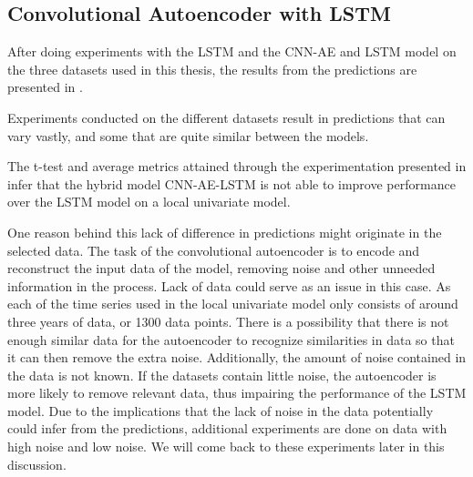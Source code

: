 
\subsection{Convolutional Autoencoder with LSTM}
\label{section:Discussion:Discussion:CNN-AE-LSTM}





After doing experiments with the LSTM and the CNN-AE and LSTM model on the three datasets used in this thesis,
the results from the predictions are presented in .


Experiments conducted on the different datasets result in predictions that can vary vastly,
and some that are quite similar between the models.

The t-test and average metrics attained through the experimentation presented in 
infer that the hybrid model CNN-AE-LSTM
is not able to improve performance over the LSTM model on a local univariate model.


One reason behind this lack of difference in predictions might originate in the selected data.
The task of the convolutional autoencoder is to encode and reconstruct the input data of the model,
removing noise and other unneeded information in the process.
Lack of data could serve as an issue in this case.
As each of the time series used in the local univariate model only consists of around three years of data, or 1300 data points.
There is a possibility that there is not enough similar data for the autoencoder to recognize similarities in data
so that it can then remove the extra noise.
Additionally, the amount of noise contained in the data is not known.
If the datasets contain little noise, the autoencoder is more likely to remove relevant data, thus impairing the performance of the LSTM model.
Due to the implications that the lack of noise in the data potentially could infer from the predictions,
additional experiments are done on data with high noise and low noise.
We will come back to these experiments later in this discussion.

